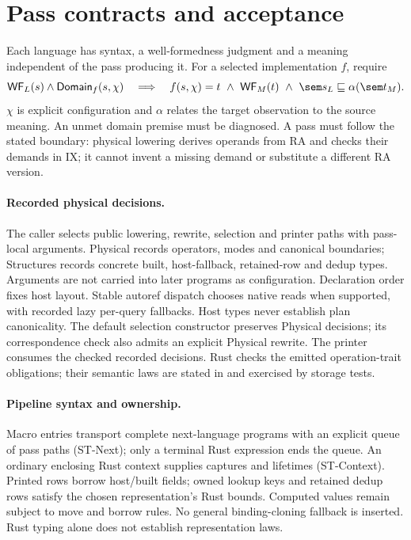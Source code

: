 \section{Pass contracts and acceptance}
\label{sec:research-contract}
Each language has syntax, a well-formedness judgment and a meaning independent
of the pass producing it. For a selected implementation $f$, require
\[
 \mathsf{WF}_L(s)\land\mathsf{Domain}_f(s,\chi)
 \quad\Longrightarrow\quad
 f(s,\chi)=t\ \land\ \mathsf{WF}_M(t)
 \ \land\ \sem s_L\sqsubseteq\alpha(\sem t_M).
\]
$\chi$ is explicit configuration and $\alpha$ relates the target observation
to the source meaning. An unmet domain premise must be diagnosed. A pass must
follow the stated boundary: physical lowering derives operands from RA and
checks their demands in IX; it cannot invent a missing demand or substitute
a different RA version.

\paragraph{Recorded physical decisions.}
The caller selects public lowering, rewrite, selection and printer paths with
pass-local arguments. Physical records operators, modes and canonical
boundaries; Structures records concrete built, host-fallback, retained-row and
dedup types. Arguments are not carried into later programs as configuration.
Declaration order fixes host layout. Stable autoref dispatch chooses native
reads when supported, with recorded lazy per-query fallbacks. Host types never
establish plan canonicality. The default selection constructor preserves Physical decisions; its
correspondence check also admits an explicit Physical rewrite. The printer
consumes the checked recorded decisions.
Rust checks the emitted operation-trait obligations; their semantic laws are
stated in  and exercised by storage tests.

\paragraph{Pipeline syntax and ownership.}
Macro entries transport complete next-language programs with an explicit queue
of pass paths (ST-Next); only a terminal Rust expression ends the queue.
An ordinary enclosing Rust context supplies captures and lifetimes
(ST-Context). Printed rows borrow host/built fields; owned lookup keys and
retained dedup rows satisfy the chosen representation's Rust bounds. Computed
values remain subject to move and borrow rules. No general binding-cloning
fallback is inserted. Rust typing alone does not establish representation laws.

